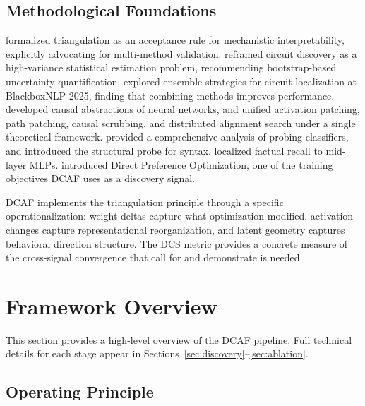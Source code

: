 \documentclass[11pt]{article}
\begin{document}
\subsection{Methodological Foundations}

\citet{long2025triangulation} formalized triangulation as an acceptance rule for mechanistic interpretability, explicitly advocating for multi-method validation. \citet{meloux2025variance} reframed circuit discovery as a high-variance statistical estimation problem, recommending bootstrap-based uncertainty quantification. \citet{mondorf2025ensemble} explored ensemble strategies for circuit localization at BlackboxNLP 2025, finding that combining methods improves performance. \citet{geiger2021causal} developed causal abstractions of neural networks, and \citet{geiger2025causal} unified activation patching, path patching, causal scrubbing, and distributed alignment search under a single theoretical framework. \citet{belinkov2022probing} provided a comprehensive analysis of probing classifiers, and \citet{hewitt2019structural} introduced the structural probe for syntax. \citet{meng2022rome} localized factual recall to mid-layer MLPs. \citet{rafailov2023dpo} introduced Direct Preference Optimization, one of the training objectives DCAF uses as a discovery signal.

DCAF implements the triangulation principle through a specific operationalization: weight deltas capture what optimization modified, activation changes capture representational reorganization, and latent geometry captures behavioral direction structure. The DCS metric provides a concrete measure of the cross-signal convergence that \citet{sharkey2025openproblems} call for and \citet{meloux2025variance} demonstrate is needed.


\section{Framework Overview}
\label{sec:overview}

This section provides a high-level overview of the DCAF pipeline. Full technical details for each stage appear in Sections~\ref{sec:discovery}--\ref{sec:ablation}.

\subsection{Operating Principle}
\end{document}
